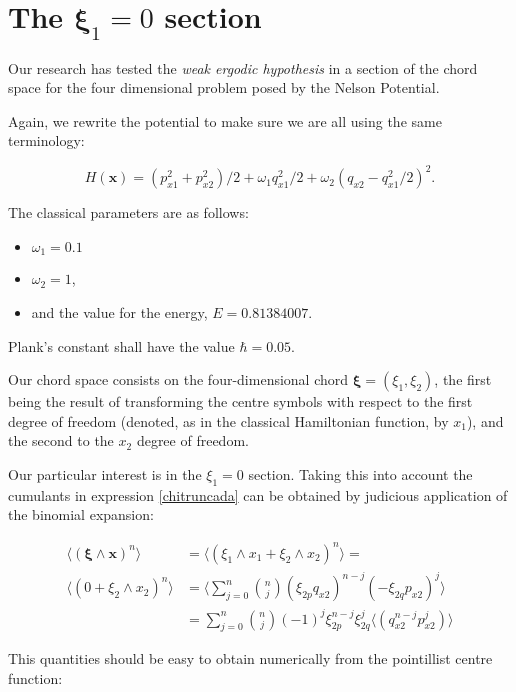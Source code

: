 \documentclass[a4paper,12pt]{article}
\newcommand{\xfase}{\mathbf{x}}
\newcommand{\xifase}{ {\boldsymbol{\xi}} }
\begin{document}
\section{The $\xifase_1=0$ section}

Our research has tested the \emph{weak ergodic hypothesis} in 
a section of the chord space for the four dimensional problem
posed by the Nelson Potential.

Again, we rewrite the potential to make sure we are all
using the same terminology:


\begin{equation}\label{classicalhamiltonian}
H(\xfase)=(p_{x1}^2+p_{x2}^2)/2+\omega_1 q_{x1}^2/2+
\omega_2(q_{x2}-q_{x1}^2/2)^2.
\end{equation}

The classical parameters are as follows:
\begin{itemize}
\item  $\omega_1=0.1$ 
\item $\omega_2=1$,
\item and the value for the energy, $E=0.81384007$.
\end{itemize}

Plank's constant shall have the value  $\hbar=0.05$.

Our chord space consists on the four-dimensional chord
$\xifase=(\xi_1, \xi_2)$, the first being the result of
transforming the centre symbols with respect to the
first degree of freedom (denoted, as in the classical
Hamiltonian function, by $x_1$), and the second
to the $x_2$ degree of freedom.

Our particular interest is in the $\xi_1=0$ section. Taking
this into account the cumulants in expression
\ref{chitruncada} can be obtained by 
judicious application of the binomial expansion:

\begin{align}
\langle (\xifase\wedge \xfase )^n \rangle & =
\langle (\xi_1\wedge x_1 + \xi_2\wedge x_2   )^n \rangle = \\
\langle (0+ \xi_2\wedge x_2 )^n \rangle & = 
\Big\langle \sum_{j=0}^n 
\binom{n}{j} (\xi_{2p} q_{x2})^{n-j}(-\xi_{2q} p_{x2})^{j} \Big\rangle \\
 &= \sum_{j=0}^n \binom{n}{j} (-1)^j\xi_{2p}^{n-j}\xi_{2q}^j 
\langle (q_{x2}^{n-j} p_{x2}^j) \rangle
\end{align}

This quantities should be easy to obtain numerically from
the pointillist centre function:
\end{document}
